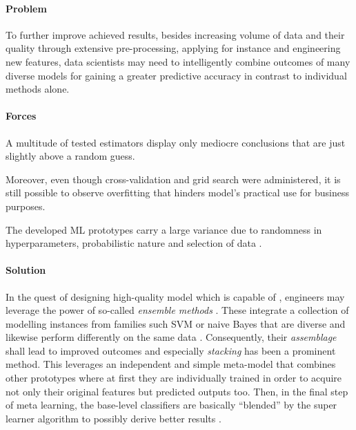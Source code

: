\paragraph*{Problem}
To further improve achieved results, besides increasing volume of data and their quality through extensive pre-processing, applying for instance  and engineering new features, data scientists may need to intelligently combine outcomes of many diverse models for gaining a greater predictive accuracy in contrast to individual methods alone. 

\paragraph*{Forces}
\begin{compactitem}
  \item A multitude of tested estimators display only mediocre conclusions that are just slightly above a random guess. 
  \item Moreover, even though cross-validation and grid search were administered, it is still possible to observe overfitting that hinders model's practical use for business purposes.
  \item The developed \ac{ML} prototypes carry a large variance due to randomness in hyperparameters, probabilistic nature and selection of data \parencite{NinaBookR2014}.
\end{compactitem}

\paragraph*{Solution}
In the quest of designing high-quality model which is capable of , engineers may leverage the power of so-called \emph{ensemble methods} \parencite[426]{JakeVanderPlas2016PythonHandbook}.
These integrate a collection of modelling instances from families such \ac{SVM} or naive Bayes that are diverse and likewise perform differently on the same data \parencite{NagiSajid2013}.
Consequently, their \emph{assemblage} shall lead to improved outcomes and especially \emph{stacking} has been a prominent method. 
This leverages an independent and simple meta-model that combines other prototypes where at first they are individually trained in order to acquire not only their original features but predicted outputs too. 
Then, in the final step of meta learning, the base-level classifiers are basically \enquote{blended} by the super learner algorithm to possibly derive better results \parencites{EnsembleML2012}{Opitz1999}.


